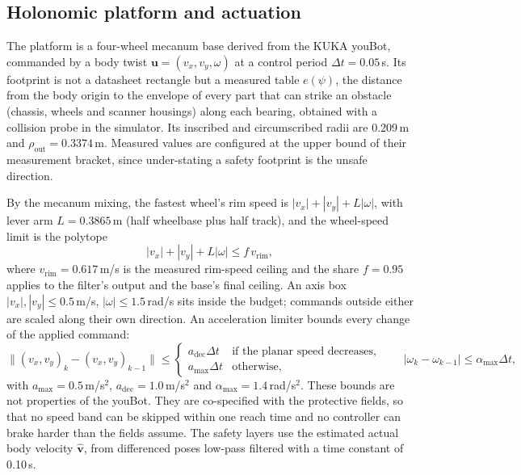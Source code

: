 \documentclass[11pt]{article}
\theoremstyle{definition}
\begin{document}
\subsection{Holonomic platform and actuation}
The platform is a four-wheel mecanum base derived from the KUKA youBot, commanded by a body twist
$\mathbf{u}=(v_x,v_y,\omega)$ at a control period $\Delta t=0.05$\,s. Its footprint is not a datasheet
rectangle but a measured table $e(\psi)$, the distance from the body origin to the envelope of every part
that can strike an obstacle (chassis, wheels and scanner housings) along each bearing, obtained with a
collision probe in the simulator. Its inscribed and circumscribed radii are 0.209\,m and
$\rho_{\mathrm{out}}=0.3374$\,m. Measured values are configured at the upper bound of their measurement
bracket, since under-stating a safety footprint is the unsafe direction.

By the mecanum mixing, the fastest wheel's rim speed is $|v_x|+|v_y|+L|\omega|$, with lever arm
$L=0.3865$\,m (half wheelbase plus half track), and the wheel-speed limit is the polytope
\begin{equation}
|v_x|+|v_y|+L|\omega|\le f\,v_{\mathrm{rim}},
\label{eq:budget}
\end{equation}
where $v_{\mathrm{rim}}=0.617$\,m/s is the measured rim-speed ceiling and the share $f=0.95$ applies to
the filter's output and the base's final ceiling. An axis box $|v_x|,|v_y|\le0.5$\,m/s,
$|\omega|\le1.5$\,rad/s sits inside the budget; commands outside either are scaled along their own
direction. An acceleration limiter bounds every change of the applied command:
\begin{equation}
\big\|(v_x,v_y)_k-(v_x,v_y)_{k-1}\big\|\le
\begin{cases}a_{\mathrm{dec}}\Delta t & \text{if the planar speed decreases},\\ a_{\max}\Delta t &
\text{otherwise},\end{cases}\qquad |\omega_k-\omega_{k-1}|\le\alpha_{\max}\Delta t,
\label{eq:limiter}
\end{equation}
with $a_{\max}=0.5$\,m/s$^2$, $a_{\mathrm{dec}}=1.0$\,m/s$^2$ and $\alpha_{\max}=1.4$\,rad/s$^2$. These bounds are not properties of the youBot. They are co-specified with the protective fields, so that no speed band can be skipped within one reach time and no controller can brake harder than the fields assume. The safety layers use the estimated actual body velocity $\hat{\mathbf{v}}$, from differenced
poses low-pass filtered with a time constant of 0.10\,s.
\end{document}
